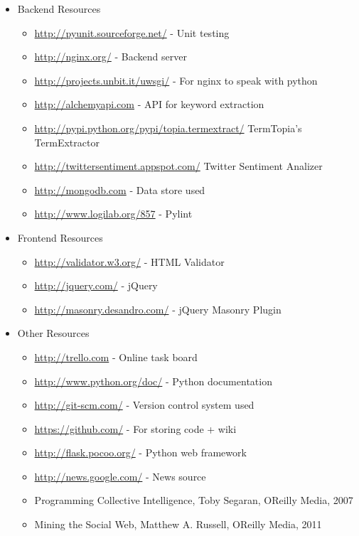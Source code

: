 \documentclass{report}
\begin{document}
	\begin{itemize}
		\item Backend Resources
		\begin{itemize}
			\item 	\url{http://pyunit.sourceforge.net/} - Unit testing
			\item 	\url{http://nginx.org/} - Backend server
			\item 	\url{http://projects.unbit.it/uwsgi/} - For nginx to speak with python
			\item 	\url{http://alchemyapi.com} - API for keyword extraction
			\item   \url{http://pypi.python.org/pypi/topia.termextract/} TermTopia's TermExtractor
			\item   \url{http://twittersentiment.appspot.com/} Twitter Sentiment Analizer
			\item 	\url{http://mongodb.com} - Data store used 
			\item 	\url{http://www.logilab.org/857} - Pylint
		\end{itemize}
		
		
		\item Frontend Resources
		\begin{itemize}
			\item 	\url{http://validator.w3.org/} - HTML Validator
			\item 	\url{http://jquery.com/} - jQuery
			\item 	\url{http://masonry.desandro.com/} - jQuery Masonry Plugin
		\end{itemize}
		
		\item Other Resources
		\begin{itemize}
			\item 	\url{http://trello.com} - Online task board
			\item 	\url{http://www.python.org/doc/} - Python documentation
			\item 	\url{http://git-scm.com/} - Version control system used
			\item 	\url{https://github.com/} - For storing code + wiki
			\item 	\url{http://flask.pocoo.org/} - Python web framework
			\item 	\url{http://news.google.com/} - News source
			\item 	Programming Collective Intelligence, Toby Segaran, OReilly Media, 2007
			\item 	Mining the Social Web, Matthew A. Russell, OReilly Media, 2011
		\end{itemize}
		
	\end{itemize} 
	
\end{document}

